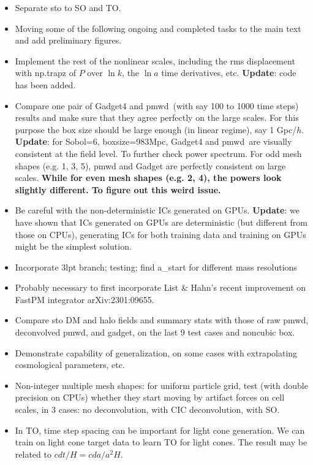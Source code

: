 \documentclass[usenatbib]{mnras}
\newcommand{\pmwd}{{\usefont{T1}{nova}{m}{sl}pmwd}}
\renewcommand{\d}{d}
\begin{document}
\begin{itemize}
\item Separate sto to SO and TO.
\item Moving some of the following ongoing and completed tasks to the
    main text and add preliminary figures.
\item Implement the rest of the nonlinear scales, including the rms
    displacement with np.trapz of $P$ over $\ln k$, the $\ln a$ time
    derivatives, etc.\newline
    \textbf{Update}: code has been added.
\item Compare one pair of Gadget4 and \pmwd\ (with say 100 to 1000 time
    steps) results and make sure that they agree perfectly on the large
    scales. For this purpose the box size should be large enough (in
    linear regime), say 1 Gpc/$h$.\newline
    \textbf{Update}: for Sobol=6, boxsize=983Mpc, Gadget4 and \pmwd\ are visually
    consistent at the field level. To further check power spectrum. For odd mesh
    shapes (e.g. 1, 3, 5), pmwd and Gadget are perfectly consistent on large
    scales. \textbf{While for even mesh shapes (e.g. 2, 4), the powers look
    slightly different. To figure out this weird issue.}
\item Be careful with the non-deterministic ICs generated on GPUs.\newline
      \textbf{Update}: we have shown that ICs generated on GPUs are
      deterministic (but different from those on CPUs), generating ICs for both
      training data and training on GPUs might be the simplest solution.
\item Incorporate 3lpt branch; testing; find a\_start for different mass
  resolutions
\item Probably necessary to first incorporate List \& Hahn's recent
  improvement on FastPM integrator arXiv:2301:09655.
\item Compare sto DM and halo fields and summary stats with those of raw
  pmwd, deconvolved pmwd, and gadget, on the last 9 test cases and
  noncubic box.
\item Demonstrate capability of generalization, on some cases with
  extrapolating cosmological parameters, etc.
\item Non-integer multiple mesh shapes: for uniform particle grid, test
  (with double precision on CPUs) whether they start moving by artifact
  forces on cell scales, in 3 cases: no deconvolution, with CIC
  deconvolution, with SO.
\item In TO, time step spacing can be important for light cone
  generation. We can train on light cone target data to learn TO for
  light cones. The result may be related to $c \d t/H = c \d a / a^2 H$.
\end{itemize}
\end{document}
